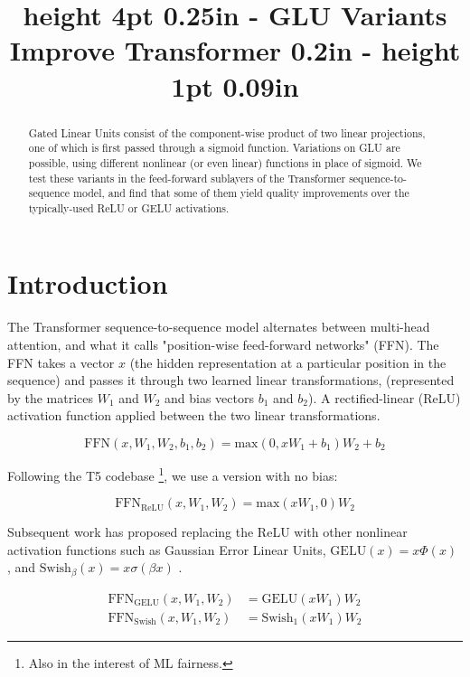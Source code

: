 \title{height 4pt 0.25in - GLU Variants Improve Transformer 0.2in - height 1pt 0.09in}

\begin{abstract}
Gated Linear Units \citep{dauphin2016} consist of the component-wise product of two linear projections, one of which is first passed through a sigmoid function.  Variations on GLU are possible, using different nonlinear (or even linear) functions in place of sigmoid.  We test these variants in the feed-forward sublayers of the Transformer \citep{Vas17} sequence-to-sequence model, and find that some of them yield quality improvements over the typically-used ReLU or GELU activations.
\end{abstract}

\section{Introduction}
The Transformer \citep{Vas17} sequence-to-sequence model alternates between multi-head attention, and what it calls "position-wise feed-forward networks" (FFN).  The FFN takes a vector $x$ (the hidden representation at a particular position in the sequence) and passes it through two learned linear transformations, (represented by the matrices $W_1$ and $W_2$ and bias vectors $b_1$ and $b_2$).  A rectified-linear (ReLU) \citep{glorot2011deep} activation function applied between the two linear transformations.

\begin{equation}
\textrm{FFN}(x, W_1, W_2, b_1, b_2) = \textrm{max}(0, xW_1 + b_1)W_2 + b_2
\end{equation}

Following the T5 codebase \citep{raffel2019exploring} \footnote{Also in the interest of ML fairness.}, we use a version with no bias:

\begin{equation}
\textrm{FFN}_\textrm{ReLU}(x, W_1, W_2) = \textrm{max}(xW_1, 0)W_2
\end{equation}

Subsequent work has proposed replacing the ReLU with other nonlinear activation functions such as Gaussian Error Linear Units, $\textrm{GELU}(x)=x\Phi(x)$ \citep{hendrycks2016}, and $\textrm{Swish}_\beta(x)=x\sigma(\beta x)$ \citep{ramachandran2017searching}.

\begin{equation}
\begin{split}
\textrm{FFN}_\textrm{GELU}(x, W_1, W_2) & = \textrm{GELU}(xW_1)W_2 \\
\textrm{FFN}_\textrm{Swish}(x, W_1, W_2) & = \textrm{Swish}_1(xW_1)W_2
\end{split}
\end{equation}

